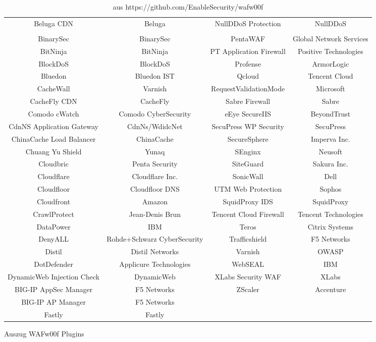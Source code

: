 \begin{table}[h]
\begin{tabular}{|c | c | c | c |}
      Beluga CDN & Beluga & NullDDoS Protection & NullDDoS\\\\
      BinarySec & BinarySec & PentaWAF  & Global Network Services\\
      BitNinja & BitNinja &   PT Application Firewall & Positive Technologies\\
      BlockDoS & BlockDoS &   Profense  & ArmorLogic\\
      Bluedon & Bluedon IST &   Qcloud   & Tencent Cloud\\
      CacheWall & Varnish &   RequestValidationMode   & Microsoft\\
      CacheFly CDN & CacheFly &   Sabre Firewall     & Sabre\\
      Comodo cWatch & Comodo CyberSecurity &   eEye SecureIIS & BeyondTrust\\
      CdnNS Application Gateway & CdnNs/WdidcNet &   SecuPress WP Security  & SecuPress\\
      ChinaCache Load Balancer & ChinaCache &   SecureSphere  & Imperva Inc.\\
      Chuang Yu Shield & Yunaq &   SEnginx       & Neusoft\\
      Cloudbric & Penta Security &   SiteGuard  & Sakura Inc.\\
      Cloudflare & Cloudflare Inc. &   SonicWall   & Dell\\
      Cloudfloor & Cloudfloor DNS &   UTM Web Protection              & Sophos\\
      Cloudfront & Amazon &   SquidProxy IDS   & SquidProxy\\
      CrawlProtect & Jean-Denis Brun &   Tencent Cloud Firewall   & Tencent Technologies\\
      DataPower & IBM &   Teros   & Citrix Systems\\
      DenyALL & Rohde+Schwarz CyberSecurity &  Trafficshield  & F5 Networks\\
      Distil & Distil Networks &   Varnish        & OWASP\\
      DotDefender & Applicure Technologies &   WebSEAL  & IBM\\
      DynamicWeb Injection Check & DynamicWeb &   XLabs Security WAF   & XLabs\\
      BIG-IP AppSec Manager & F5 Networks &   ZScaler & Accenture\\
      BIG-IP AP Manager & F5 Networks\\
      Fastly & Fastly\\
      \hline
      
      
\end{tabular}
\caption{Auszug WAFw00f Plugins}
\caption*{aus https://github.com/EnableSecurity/wafw00f}
    \label{tab:my_label}
\end{table}



